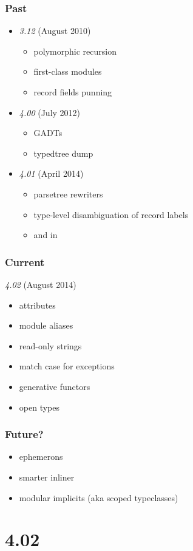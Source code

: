 \begin{frame}
\frametitle{Past}
\begin{itemize}
\item \emph{3.12} (August 2010)
\begin{itemize}
\item polymorphic recursion
\item first-class modules
\item record fields punning
\end{itemize}
\item \emph{4.00} (July 2012)
\begin{itemize}
\item GADTs
\item {} typedtree dump
\end{itemize}
\item \emph{4.01} (April 2014)
\begin{itemize}
\item {} parsetree rewriters
\item type-level disambiguation of record labels
\item \cmd{(|>)} and  in 
\end{itemize}
\end{itemize}
\end{frame}

\begin{frame}
\frametitle{Current}
\emph{4.02} (August 2014)
\begin{itemize}
\item attributes
\item module aliases
\item {} read-only strings
\item match case for exceptions
\item generative functors
\item open types
\end{itemize}
\end{frame}

\begin{frame}
\frametitle{Future?}
\begin{itemize}
\item ephemerons
\item smarter inliner
\item modular implicits (aka scoped typeclasses)
\end{itemize}
\end{frame}

\section{4.02}

